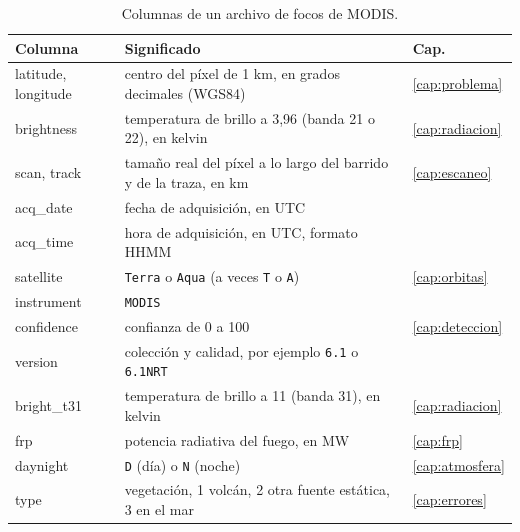 \begin{table}[ht]
\centering
\small
\renewcommand{\arraystretch}{1.15}
\begin{tabularx}{\textwidth}{>{\ttfamily}l>{\raggedright\arraybackslash}Xl}
\toprule
\normalfont Columna & Significado & Cap. \\
\midrule
latitude, longitude & centro del píxel de 1 km, en grados decimales (WGS84) & \ref{cap:problema} \\
brightness & temperatura de brillo a 3,96 \um{} (banda 21 o 22), en kelvin & \ref{cap:radiacion} \\
scan, track & tamaño real del píxel a lo largo del barrido y de la traza, en km & \ref{cap:escaneo} \\
acq\_date & fecha de adquisición, en UTC & \\
acq\_time & hora de adquisición, en UTC, formato HHMM & \\
satellite & \texttt{Terra} o \texttt{Aqua} (a veces \texttt{T} o \texttt{A}) & \ref{cap:orbitas} \\
instrument & \texttt{MODIS} & \\
confidence & confianza de 0 a 100 & \ref{cap:deteccion} \\
version & colección y calidad, por ejemplo \texttt{6.1} o \texttt{6.1NRT} & \\
bright\_t31 & temperatura de brillo a 11 \um{} (banda 31), en kelvin & \ref{cap:radiacion} \\
frp & potencia radiativa del fuego, en MW & \ref{cap:frp} \\
daynight & \texttt{D} (día) o \texttt{N} (noche) & \ref{cap:atmosfera} \\
type & 0 vegetación, 1 volcán, 2 otra fuente estática, 3 en el mar & \ref{cap:errores} \\
\bottomrule
\end{tabularx}
\caption{Columnas de un archivo de focos de MODIS.}
\label{tab:col-modis}
\end{table}

